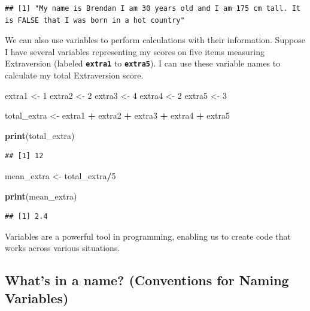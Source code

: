 \documentclass[
]{book}
\newenvironment{Shaded}{\begin{snugshade}}{\end{snugshade}}
\newcommand{\DecValTok}[1]{\textcolor[rgb]{0.00,0.00,0.81}{#1}}
\newcommand{\FunctionTok}[1]{\textcolor[rgb]{0.13,0.29,0.53}{\textbf{#1}}}
\newcommand{\NormalTok}[1]{#1}
\newcommand{\OtherTok}[1]{\textcolor[rgb]{0.56,0.35,0.01}{#1}}
\newcommand{\SpecialCharTok}[1]{\textcolor[rgb]{0.81,0.36,0.00}{\textbf{#1}}}
\begin{document}
\begin{verbatim}
## [1] "My name is Brendan I am 30 years old and I am 175 cm tall. It is FALSE that I was born in a hot country"
\end{verbatim}

We can also use variables to perform calculations with their information. Suppose I have several variables representing my scores on five items measuring Extraversion (labeled \textbf{\texttt{extra1}} to \textbf{\texttt{extra5}}). I can use these variable names to calculate my total Extraversion score.

\begin{Shaded}
\begin{Highlighting}[]
\NormalTok{extra1 }\OtherTok{\textless{}{-}} \DecValTok{1}
\NormalTok{extra2 }\OtherTok{\textless{}{-}} \DecValTok{2}
\NormalTok{extra3 }\OtherTok{\textless{}{-}} \DecValTok{4}
\NormalTok{extra4 }\OtherTok{\textless{}{-}} \DecValTok{2}
\NormalTok{extra5 }\OtherTok{\textless{}{-}} \DecValTok{3}

\NormalTok{total\_extra }\OtherTok{\textless{}{-}}\NormalTok{ extra1 }\SpecialCharTok{+}\NormalTok{ extra2 }\SpecialCharTok{+}\NormalTok{ extra3 }\SpecialCharTok{+}\NormalTok{ extra4 }\SpecialCharTok{+}\NormalTok{ extra5}

\FunctionTok{print}\NormalTok{(total\_extra)}
\end{Highlighting}
\end{Shaded}

\begin{verbatim}
## [1] 12
\end{verbatim}

\begin{Shaded}
\begin{Highlighting}[]
\NormalTok{mean\_extra }\OtherTok{\textless{}{-}}\NormalTok{  total\_extra}\SpecialCharTok{/}\DecValTok{5}

\FunctionTok{print}\NormalTok{(mean\_extra)}
\end{Highlighting}
\end{Shaded}

\begin{verbatim}
## [1] 2.4
\end{verbatim}

Variables are a powerful tool in programming, enabling us to create code that works across various situations.

\subsection{What's in a name? (Conventions for Naming Variables)}\label{whats-in-a-name-conventions-for-naming-variables}
\end{document}
